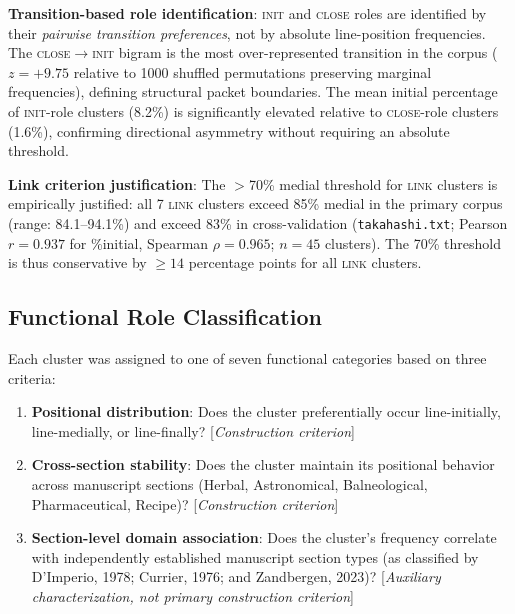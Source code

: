 \documentclass[11pt,a4paper,twocolumn]{article}
\begin{document}
\noindent\textbf{Transition-based role identification}: \textsc{init} and \textsc{close} roles are identified by their \textit{pairwise transition preferences}, not by absolute line-position frequencies. The \textsc{close}$\to$\textsc{init} bigram is the most over-represented transition in the corpus ($z=+9.75$ relative to 1000 shuffled permutations preserving marginal frequencies), defining structural packet boundaries. The mean initial percentage of \textsc{init}-role clusters (8.2\%) is significantly elevated relative to \textsc{close}-role clusters (1.6\%), confirming directional asymmetry without requiring an absolute threshold.

\noindent\textbf{Link criterion justification}: The $>$70\% medial threshold for \textsc{link} clusters is empirically justified: all 7 \textsc{link} clusters exceed 85\% medial in the primary corpus (range: 84.1--94.1\%) and exceed 83\% in cross-validation (\texttt{takahashi.txt}; Pearson $r=0.937$ for \%initial, Spearman $\rho=0.965$; $n=45$ clusters). The 70\% threshold is thus conservative by $\geq 14$ percentage points for all \textsc{link} clusters.

\subsection{Functional Role Classification}
\label{sec:roleclassification}

Each cluster was assigned to one of seven functional categories based on three criteria:

\begin{enumerate}[leftmargin=*,itemsep=2pt]
    \item \textbf{Positional distribution}: Does the cluster preferentially occur line-initially, line-medially, or line-finally? [\textit{Construction criterion}]
    \item \textbf{Cross-section stability}: Does the cluster maintain its positional behavior across manuscript sections (Herbal, Astronomical, Balneological, Pharmaceutical, Recipe)? [\textit{Construction criterion}]
    \item \textbf{Section-level domain association}: Does the cluster's frequency correlate with independently established manuscript section types (as classified by D'Imperio, 1978; Currier, 1976; and Zandbergen, 2023)? [\textit{Auxiliary characterization, not primary construction criterion}]
\end{enumerate}
\end{document}
